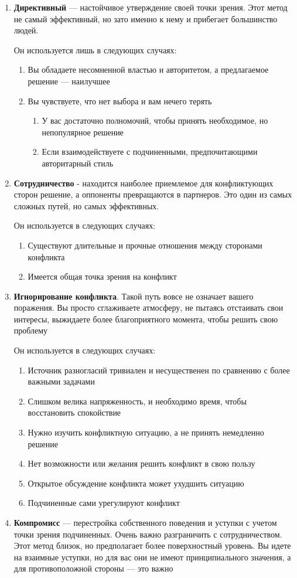 \documentclass[a4paper,14pt]{extarticle}
\begin{document}
\begin{enumerate}
    \item \textbf{Директивный} — настойчивое утверждение своей точки зрения. Этот метод не самый эффективный, но зато именно к нему и прибегает большинство людей.

    Он используется лишь в следующих случаях:
    \begin{enumerate}
        \item Вы обладаете несомненной властью и авторитетом, а предлагаемое решение — наилучшее
        \item Вы чувствуете, что нет выбора и вам нечего терять
        \begin{enumerate}
            \item У вас достаточно полномочий, чтобы принять необходимое, но непопулярное решение
            \item Если взаимодействуете с подчиненными, предпочитающими авторитарный стиль
        \end{enumerate}
    \end{enumerate}
    \item \textbf{Сотрудничество} - находится наиболее приемлемое для конфликтующих сторон решение, а оппоненты превращаются в партнеров. Это один из самых сложных путей, но самых эффективных.

    Он используется в следующих случаях:
    \begin{enumerate}
        \item Существуют длительные и прочные отношения между сторонами конфликта
        \item Имеется общая точка зрения на конфликт
    \end{enumerate}
    \item \textbf{Игнорирование конфликта}. Такой путь вовсе не означает вашего поражения. Вы просто сглаживаете атмосферу, не пытаясь отстаивать свои интересы, выжидаете более благоприятного момента, чтобы решить свою проблему

    Он используется в следующих случаях:
    \begin{enumerate}
        \item Источник разногласий тривиален и несущественен по сравнению с более важными задачами
        \item Слишком велика напряженность, и необходимо время, чтобы восстановить спокойствие
        \item Нужно изучить конфликтную ситуацию, а не принять немедленно решение
        \item Нет возможности или желания решить конфликт в свою пользу
        \item Открытое обсуждение конфликта может ухудшить ситуацию
        \item Подчиненные сами урегулируют конфликт
    \end{enumerate}
    \item \textbf{Компромисс} — перестройка собственного поведения и уступки с учетом точки зрения подчиненных. Очень важно разграничить с сотрудничеством. Этот метод близок, но предполагает более поверхностный уровень. Вы идете на взаимные уступки, но для вас они не имеют принципиального значения, а для противоположной стороны — это важно


\end{enumerate}
\end{document}
